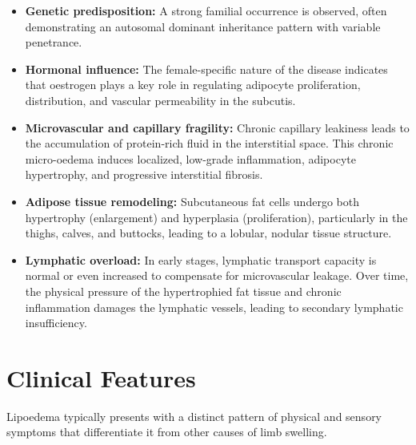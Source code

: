 \begin{itemize}
    \item \textbf{Genetic predisposition:} A strong familial occurrence is observed, often demonstrating an autosomal dominant inheritance pattern with variable penetrance.
    \item \textbf{Hormonal influence:} The female-specific nature of the disease indicates that oestrogen plays a key role in regulating adipocyte proliferation, distribution, and vascular permeability in the subcutis.
    \item \textbf{Microvascular and capillary fragility:} Chronic capillary leakiness leads to the accumulation of protein-rich fluid in the interstitial space. This chronic micro-oedema induces localized, low-grade inflammation, adipocyte hypertrophy, and progressive interstitial fibrosis.
    \item \textbf{Adipose tissue remodeling:} Subcutaneous fat cells undergo both hypertrophy (enlargement) and hyperplasia (proliferation), particularly in the thighs, calves, and buttocks, leading to a lobular, nodular tissue structure.
    \item \textbf{Lymphatic overload:} In early stages, lymphatic transport capacity is normal or even increased to compensate for microvascular leakage. Over time, the physical pressure of the hypertrophied fat tissue and chronic inflammation damages the lymphatic vessels, leading to secondary lymphatic insufficiency.
\end{itemize}

\section*{Clinical Features}
Lipoedema typically presents with a distinct pattern of physical and sensory symptoms that differentiate it from other causes of limb swelling.

